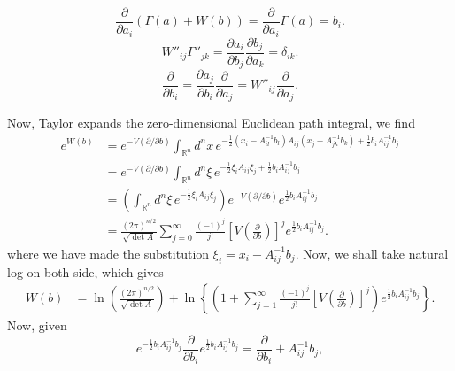 \begin{solution}
    \begin{equation}
        \frac{\partial}{\partial a_i}\left(\Gamma(a) + W(b)\right) = \frac{\partial}{\partial a_i}\Gamma(a) = b_i.
    \end{equation}
    \begin{equation}
        W''_{ij}{\Gamma}''_{jk} = \frac{\partial a_i}{\partial b_j}\frac{\partial b_j}{\partial a_k} = \delta_{ik}.
    \end{equation}
    \begin{equation}
        \frac{\partial}{\partial b_i} = \frac{\partial a_j}{\partial b_i}\frac{\partial}{\partial a_j} = W''_{ij}\frac{\partial}{\partial a_j}.
    \end{equation}

    Now, Taylor expands the zero-dimensional Euclidean path integral, we find
    \begin{equation}
        \begin{aligned}
            e^{W(b)} &= e^{-V(\partial/\partial b)}\int_{\mathbb{R}^n} d^n x \,e^{-\frac{1}{2}(x_i-A_{il}^{-1}b_l)A_{ij}(x_j-A_{jk}^{-1}b_k) + \frac{1}{2}b_i A_{ij}^{-1}b_j}\\
            &=e^{-V(\partial/\partial b)}\int_{\mathbb{R}^n} d^n \xi \, e^{-\frac{1}{2}\xi_i A_{ij}\xi_j + \frac{1}{2}b_i A_{ij}^{-1}b_j}\\
            &=\left(\int_{\mathbb{R}^n}d^n \xi\, e^{-\frac{1}{2}\xi_i A_{ij}\xi_j}\right)e^{-V(\partial/\partial b)}e^{\frac{1}{2}b_iA_{ij}^{-1}b_j}\\
            &=\frac{(2\pi)^{n/2}}{\sqrt{\det A}}\sum_{j=0}^\infty\frac{(-1)^j}{j!}\left[V\left(\frac{\partial}{\partial b}\right)\right]^je^{\frac{1}{2}b_iA_{ij}^{-1}b_j}.
        \end{aligned}
    \end{equation}
    where we have made the substitution $\xi_i = x_i -A_{ij}^{-1}b_j$. Now, we shall take natural log on both side, which gives
    \begin{equation}
        \begin{aligned}
            W(b) &=\ln\left(\frac{(2\pi)^{n/2}}{\sqrt{\det A}}\right) + \ln\left\{\left(1 + \sum_{j=1}^\infty\frac{(-1)^j}{j!}\left[V\left(\frac{\partial}{\partial b}\right)\right]^j\right)e^{\frac{1}{2}b_iA_{ij}^{-1}b_j}\right\}.
        \end{aligned}
    \end{equation}
    Now, given
    \begin{equation}
        e^{-\frac{1}{2}b_iA_{ij}^{-1}b_j}\frac{\partial}{\partial b_i}e^{\frac{1}{2}b_iA_{ij}^{-1}b_j} = \frac{\partial}{\partial b_i} + A_{ij}^{-1}b_j,

\end{equation}
\end{solution}
